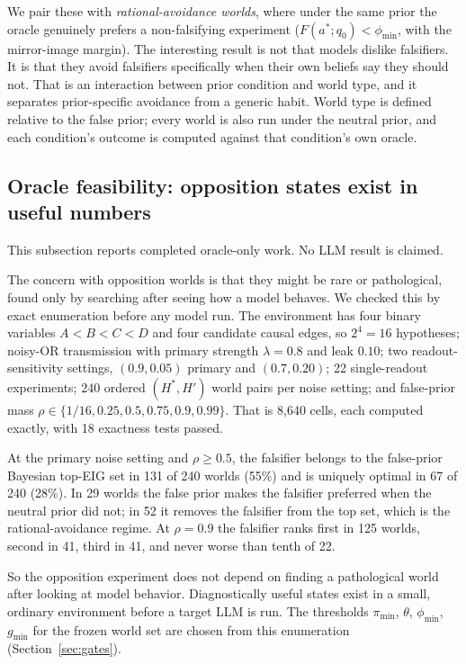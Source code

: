 \documentclass[10pt,letterpaper,twocolumn]{article}
\begin{document}
We pair these with \emph{rational-avoidance worlds}, where under the same prior the oracle genuinely prefers a non-falsifying experiment ($F(a^*;q_0) < \phi_{\min}$, with the mirror-image margin). The interesting result is not that models dislike falsifiers. It is that they avoid falsifiers specifically when their own beliefs say they should not. That is an interaction between prior condition and world type, and it separates prior-specific avoidance from a generic habit. World type is defined relative to the false prior; every world is also run under the neutral prior, and each condition's outcome is computed against that condition's own oracle.

\subsection{Oracle feasibility: opposition states exist in useful numbers}
\label{sec:feasibility}
This subsection reports completed oracle-only work. No LLM result is claimed.

The concern with opposition worlds is that they might be rare or pathological, found only by searching after seeing how a model behaves. We checked this by exact enumeration before any model run. The environment has four binary variables $A<B<C<D$ and four candidate causal edges, so $2^4 = 16$ hypotheses; noisy-OR transmission with primary strength $\lambda = 0.8$ and leak $0.10$; two readout-sensitivity settings, $(0.9, 0.05)$ primary and $(0.7, 0.20)$; 22 single-readout experiments; 240 ordered $(H^*, H')$ world pairs per noise setting; and false-prior mass $\rho \in \{1/16, 0.25, 0.5, 0.75, 0.9, 0.99\}$. That is 8,640 cells, each computed exactly, with 18 exactness tests passed.

At the primary noise setting and $\rho \ge 0.5$, the falsifier belongs to the false-prior Bayesian top-EIG set in 131 of 240 worlds (55\%) and is uniquely optimal in 67 of 240 (28\%). In 29 worlds the false prior makes the falsifier preferred when the neutral prior did not; in 52 it removes the falsifier from the top set, which is the rational-avoidance regime. At $\rho = 0.9$ the falsifier ranks first in 125 worlds, second in 41, third in 41, and never worse than tenth of 22.

So the opposition experiment does not depend on finding a pathological world after looking at model behavior. Diagnostically useful states exist in a small, ordinary environment before a target LLM is run. The thresholds $\pi_{\min}$, $\theta$, $\phi_{\min}$, $g_{\min}$ for the frozen world set are chosen from this enumeration (Section~\ref{sec:gates}).
\end{document}
